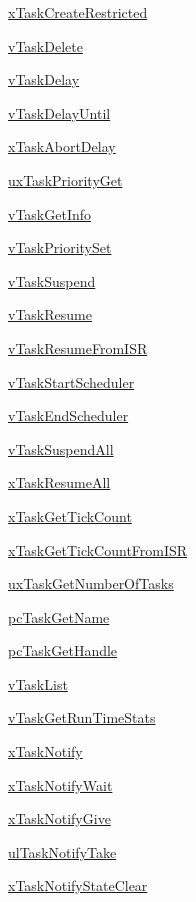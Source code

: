 \begin{DoxyCompactItemize}
\hyperlink{group__x_task_create_restricted}{x\+Task\+Create\+Restricted}
\item 
\hyperlink{group__v_task_delete}{v\+Task\+Delete}
\item 
\hyperlink{group__v_task_delay}{v\+Task\+Delay}
\item 
\hyperlink{group__v_task_delay_until}{v\+Task\+Delay\+Until}
\item 
\hyperlink{group__x_task_abort_delay}{x\+Task\+Abort\+Delay}
\item 
\hyperlink{group__ux_task_priority_get}{ux\+Task\+Priority\+Get}
\item 
\hyperlink{group__v_task_get_info}{v\+Task\+Get\+Info}
\item 
\hyperlink{group__v_task_priority_set}{v\+Task\+Priority\+Set}
\item 
\hyperlink{group__v_task_suspend}{v\+Task\+Suspend}
\item 
\hyperlink{group__v_task_resume}{v\+Task\+Resume}
\item 
\hyperlink{group__v_task_resume_from_i_s_r}{v\+Task\+Resume\+From\+I\+SR}
\item 
\hyperlink{group__v_task_start_scheduler}{v\+Task\+Start\+Scheduler}
\item 
\hyperlink{group__v_task_end_scheduler}{v\+Task\+End\+Scheduler}
\item 
\hyperlink{group__v_task_suspend_all}{v\+Task\+Suspend\+All}
\item 
\hyperlink{group__x_task_resume_all}{x\+Task\+Resume\+All}
\item 
\hyperlink{group__x_task_get_tick_count}{x\+Task\+Get\+Tick\+Count}
\item 
\hyperlink{group__x_task_get_tick_count_from_i_s_r}{x\+Task\+Get\+Tick\+Count\+From\+I\+SR}
\item 
\hyperlink{group__ux_task_get_number_of_tasks}{ux\+Task\+Get\+Number\+Of\+Tasks}
\item 
\hyperlink{group__pc_task_get_name}{pc\+Task\+Get\+Name}
\item 
\hyperlink{group__pc_task_get_handle}{pc\+Task\+Get\+Handle}
\item 
\hyperlink{group__v_task_list}{v\+Task\+List}
\item 
\hyperlink{group__v_task_get_run_time_stats}{v\+Task\+Get\+Run\+Time\+Stats}
\item 
\hyperlink{group__x_task_notify}{x\+Task\+Notify}
\item 
\hyperlink{group__x_task_notify_wait}{x\+Task\+Notify\+Wait}
\item 
\hyperlink{group__x_task_notify_give}{x\+Task\+Notify\+Give}
\item 
\hyperlink{group__ul_task_notify_take}{ul\+Task\+Notify\+Take}
\item 
\hyperlink{group__x_task_notify_state_clear}{x\+Task\+Notify\+State\+Clear}
\end{DoxyCompactItemize}

